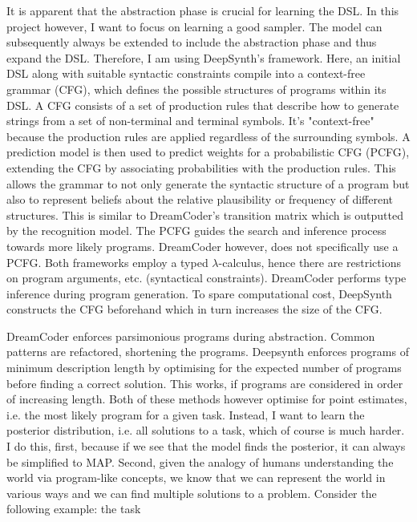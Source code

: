 It is apparent that the abstraction phase is crucial for learning the DSL. In this project however, I want to focus on learning a good sampler. The model can subsequently always be extended to include the abstraction phase and thus expand the DSL. Therefore, I am using DeepSynth's framework.
Here, an initial DSL along with suitable syntactic constraints compile into a context-free grammar (CFG), which defines the possible structures of programs within its DSL. A CFG consists of a set of production rules that describe how to generate strings from a set of non-terminal and terminal symbols. It's "context-free" because the production rules are applied regardless of the surrounding symbols.
A prediction model is then used to predict weights for a probabilistic CFG (PCFG), extending the CFG by associating probabilities with the production rules. This allows the grammar to not only generate the syntactic structure of a program but also to represent beliefs about the relative plausibility or frequency of different structures. This is similar to DreamCoder's transition matrix which is outputted by the recognition model. The PCFG guides the search and inference process towards more likely programs. DreamCoder however, does not specifically use a PCFG. Both frameworks employ a typed $\lambda$-calculus, hence there are restrictions on program arguments, etc. (syntactical constraints). DreamCoder performs type inference during program generation. To spare computational cost, DeepSynth constructs the CFG beforehand which in turn increases the size of the CFG.



DreamCoder enforces parsimonious programs during abstraction. Common patterns are refactored, shortening the programs. Deepsynth enforces programs of minimum description length by optimising for the expected number of programs before finding a correct solution. This works, if programs are considered in order of increasing length. Both of these methods however optimise for point estimates, i.e. the most likely program for a given task. Instead, I want to learn the posterior distribution, i.e. all solutions to a task, which of course is much harder.
I do this, first, because if we see that the model finds the posterior, it can always be simplified to MAP. Second, given the analogy of humans understanding the world via program-like concepts, we know that we can represent the world in various ways and we can find multiple solutions to a problem. Consider the following example: the task 

